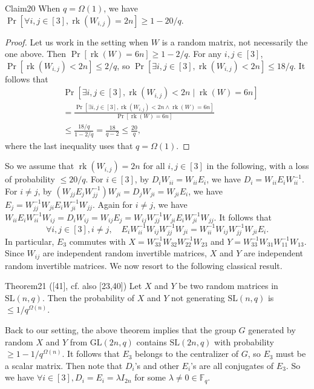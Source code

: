 \begin{authorclaim}{Claim20}
When $q=\Omega(1)$, we have $\Pr[\forall i,j\in[3],\operatorname{rk}(W_{i,j})=2n]\ge1-20/q$.
\end{authorclaim}
\begin{proof}
Let us work in the setting when $W$ is a random matrix, not necessarily the one above. Then $\Pr[\operatorname{rk}(W)=6n]\ge1-2/q$. For any $i,j\in[3]$, $\Pr[\operatorname{rk}(W_{i,j})<2n]\le2/q$, so $\Pr[\exists i,j\in[3],\operatorname{rk}(W_{i,j})<2n]\le18/q$. It follows that
\begin{align*}
&\Pr[\exists i,j\in[3],\operatorname{rk}(W_{i,j})<2n\mid\operatorname{rk}(W)=6n]\\
&=\frac{\Pr[\exists i,j\in[3],\operatorname{rk}(W_{i,j})<2n\wedge\operatorname{rk}(W)=6n]}{\Pr[\operatorname{rk}(W)=6n]}\\
&\le\frac{18/q}{1-2/q}=\frac{18}{q-2}\le\frac{20}q,
\end{align*}
where the last inequality uses that $q=\Omega(1)$.
\end{proof}
So we assume that $\operatorname{rk}(W_{i,j})=2n$ for all $i,j\in[3]$ in the following, with a loss of probability $\le20/q$.
For $i\in[3]$, by $D_iW_{ii}=W_{ii}E_i$, we have $D_i=W_{ii}E_iW_{ii}^{-1}$. For $i\ne j$, by $(W_{jj}E_jW_{jj}^{-1})W_{ji}=D_jW_{ji}=W_{ji}E_i$, we have $E_j=W_{jj}^{-1}W_{ji}E_iW_{ji}^{-1}W_{jj}$. Again for $i\ne j$, we have $W_{ii}E_iW_{ii}^{-1}W_{ij}=D_iW_{ij}=W_{ij}E_j=W_{ij}W_{jj}^{-1}W_{ji}E_iW_{ji}^{-1}W_{jj}$. It follows that
\[\forall i,j\in[3],i\ne j,\quad E_iW_{ii}^{-1}W_{ij}W_{jj}^{-1}W_{ji}=W_{ii}^{-1}W_{ij}W_{jj}^{-1}W_{ji}E_i.\]
In particular, $E_3$ commutes with $X=W_{33}^{-1}W_{32}W_{22}^{-1}W_{23}$ and $Y=W_{33}^{-1}W_{31}W_{11}^{-1}W_{13}$. Since $W_{ij}$ are independent random invertible matrices, $X$ and $Y$ are independent random invertible matrices. We now resort to the following classical result.
\begin{authorclaim}{Theorem21 ([41], cf. also [23,40])}
Let $X$ and $Y$ be two random matrices in $\mathrm{SL}(n,q)$. Then the probability of $X$ and $Y$ not generating $\mathrm{SL}(n,q)$ is $\le1/q^{\Omega(n)}$.
\end{authorclaim}
Back to our setting, the above theorem implies that the group $G$ generated by random $X$ and $Y$ from $\mathrm{GL}(2n,q)$ contains $\mathrm{SL}(2n,q)$ with probability $\ge1-1/q^{\Omega(n)}$. It follows that $E_3$ belongs to the centralizer of $G$, so $E_3$ must be a scalar matrix. Then note that $D_i$'s and other $E_i$'s are all conjugates of $E_3$. So we have $\forall i\in[3],D_i=E_i=\lambda I_{2n}$ for some $\lambda\ne0\in\mathbb F_q$.
